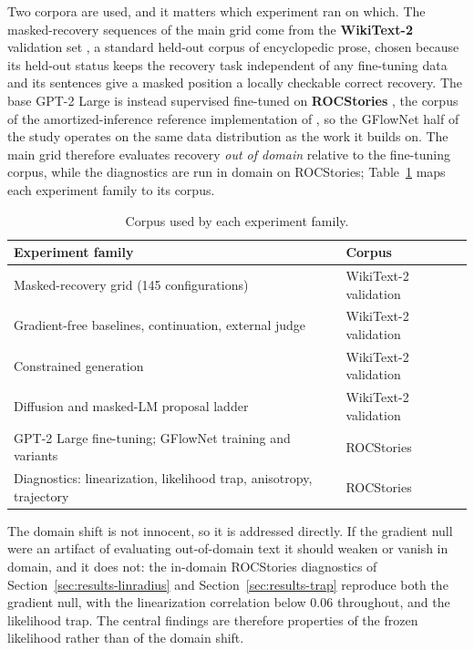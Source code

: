 Two corpora are used, and it matters which experiment ran on which. The masked-recovery sequences of the main grid come from the \textbf{WikiText-2} validation set \citep{merity2017pointer}, a standard held-out corpus of encyclopedic prose, chosen because its held-out status keeps the recovery task independent of any fine-tuning data and its sentences give a masked position a locally checkable correct recovery. The base GPT-2 Large is instead supervised fine-tuned on \textbf{ROCStories} \citep{mostafazadeh2016corpus}, the corpus of the amortized-inference reference implementation of \citet{hu2024amortizing}, so the GFlowNet half of the study operates on the same data distribution as the work it builds on. The main grid therefore evaluates recovery \emph{out of domain} relative to the fine-tuning corpus, while the diagnostics are run in domain on ROCStories; Table~\ref{tab:corpus-map} maps each experiment family to its corpus.

\begin{table}[htbp]
    \centering
    \small
    \begin{tabular}{ll}
        \toprule
        Experiment family & Corpus \\
        \midrule
        Masked-recovery grid (145 configurations) & WikiText-2 validation \\
        Gradient-free baselines, continuation, external judge & WikiText-2 validation \\
        Constrained generation & WikiText-2 validation \\
        Diffusion and masked-LM proposal ladder & WikiText-2 validation \\
        GPT-2 Large fine-tuning; GFlowNet training and variants & ROCStories \\
        Diagnostics: linearization, likelihood trap, anisotropy, trajectory & ROCStories \\
        \bottomrule
    \end{tabular}
    \caption[Corpus used by each experiment family.]{Corpus used by each experiment family.}
    \label{tab:corpus-map}
\end{table}

The domain shift is not innocent, so it is addressed directly. If the gradient null were an artifact of evaluating out-of-domain text it should weaken or vanish in domain, and it does not: the in-domain ROCStories diagnostics of Section~\ref{sec:results-linradius} and Section~\ref{sec:results-trap} reproduce both the gradient null, with the linearization correlation below $0.06$ throughout, and the likelihood trap. The central findings are therefore properties of the frozen likelihood rather than of the domain shift.

